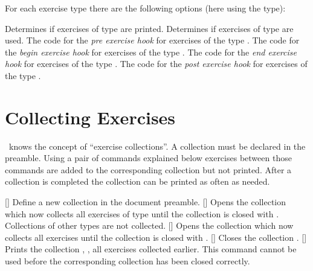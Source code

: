 \documentclass[load-preamble+]{cnltx-doc}
\begin{document}
For each exercise type there are the following options (here using the
 type):
\begin{options}
    Determines if exercises of type  are printed.
    Determines if exercises of type  are used.
  \Default
    The code for the \emph{pre exercise hook} for exercises of the type
    .
  \Default
    The code for the \emph{begin exercise hook} for exercises of the type
    .
  \Default
    The code for the \emph{end exercise hook} for exercises of the type
    .
  \Default
    The code for the \emph{post exercise hook} for exercises of the type
    .
\end{options}

\section{Collecting Exercises}\label{sec:collecting-exercises}

\xsim\ knows the concept of \enquote{exercise collections}.  A collection must
be declared in the preamble.  Using a pair of commands explained below
exercises between those commands are added to the corresponding collection but
not printed.  After a collection is completed the collection can be printed as
often as needed.
\begin{commands}
  []
    Define a new collection  in the document preamble.
  []
    Opens the collection  which now collects all
    exercises of type  until the collection is closed with
    .  Collections of other types are not collected.
  []
    Opens the collection  which now collects all
    exercises until the collection is closed with .
  []
    Closes the collection .
  []
    Prints the collection , \ie, all exercises collected
    earlier.  This command cannot be used before the corresponding collection
    has been closed correctly.
\end{commands}
\end{document}
